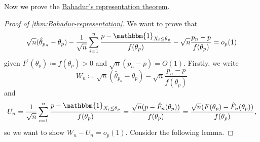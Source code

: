 Now we prove the \hyperref[thm:Bahadur-representation]{Bahadur's representation theorem}.

\begin{proof}[Proof of \autoref{thm:Bahadur-representation}]\label{pf:Bahadur-representation}
	We want to prove that
	\[
		\sqrt{n} (\hat{\theta} _{p_n} - \theta _p) - \frac{1}{\sqrt{n} } \sum_{i=1}^{n} \frac{p - \mathbbm{1}_{X_i \leq \theta _p} }{f(\theta _p)} - \sqrt{n} \frac{p_n - p}{f(\theta _p)} = o_p(1)
	\]
	given \(F^{\prime} (\theta _p) \coloneqq f(\theta _p) > 0\) and \(\sqrt{n} (p_n - p) = O(1)\). Firstly, we write
	\[
		W_n \coloneqq \sqrt{n} (\hat{\theta} _{p_n} - \theta _p) - \sqrt{n} \frac{p_n - p}{f(\theta _p)}
	\]
	and
	\[
		U_n
		= \frac{1}{\sqrt{n} } \sum_{i=1}^{n} \frac{p - \mathbbm{1}_{X_i \leq \theta _p} }{f(\theta _p)}
		= \frac{\sqrt{n} (p - \hat{F} _n (\theta _p))}{f(\theta _p)}
		= \frac{\sqrt{n} (F(\theta _p) - \hat{F} _n(\theta _p))}{f(\theta _p)},
	\]
	so we want to show \(W_n - U_n = o_p(1)\). Consider the following lemma.


\end{proof}
